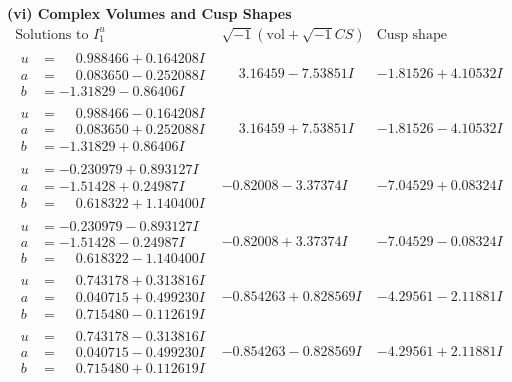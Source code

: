 \documentclass[1p]{elsarticle_modified}
\theoremstyle{definition}
\newcommand{\I}{\sqrt{-1}}
\begin{document}
\newpage\flushleft \textbf{(vi) Complex Volumes and Cusp Shapes}
$$\begin{array}{c|c|c}  
\text{Solutions to }I^u_{1}& \I (\text{vol} + \sqrt{-1}CS) & \text{Cusp shape}\\
 \hline 
\begin{aligned}
u &= \phantom{-}0.988466 + 0.164208 I \\
a &= \phantom{-}0.083650 - 0.252088 I \\
b &= -1.31829 - 0.86406 I\end{aligned}
 & \phantom{-}3.16459 - 7.53851 I & -1.81526 + 4.10532 I \\ \hline\begin{aligned}
u &= \phantom{-}0.988466 - 0.164208 I \\
a &= \phantom{-}0.083650 + 0.252088 I \\
b &= -1.31829 + 0.86406 I\end{aligned}
 & \phantom{-}3.16459 + 7.53851 I & -1.81526 - 4.10532 I \\ \hline\begin{aligned}
u &= -0.230979 + 0.893127 I \\
a &= -1.51428 + 0.24987 I \\
b &= \phantom{-}0.618322 + 1.140400 I\end{aligned}
 & -0.82008 - 3.37374 I & -7.04529 + 0.08324 I \\ \hline\begin{aligned}
u &= -0.230979 - 0.893127 I \\
a &= -1.51428 - 0.24987 I \\
b &= \phantom{-}0.618322 - 1.140400 I\end{aligned}
 & -0.82008 + 3.37374 I & -7.04529 - 0.08324 I \\ \hline\begin{aligned}
u &= \phantom{-}0.743178 + 0.313816 I \\
a &= \phantom{-}0.040715 + 0.499230 I \\
b &= \phantom{-}0.715480 - 0.112619 I\end{aligned}
 & -0.854263 + 0.828569 I & -4.29561 - 2.11881 I \\ \hline\begin{aligned}
u &= \phantom{-}0.743178 - 0.313816 I \\
a &= \phantom{-}0.040715 - 0.499230 I \\
b &= \phantom{-}0.715480 + 0.112619 I\end{aligned}
 & -0.854263 - 0.828569 I & -4.29561 + 2.11881 I \\ \hline\begin{aligned}

\end{aligned}
\end{array}$$
\end{document}
